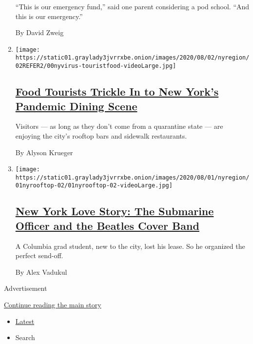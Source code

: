 \begin{enumerate}
  ``This is our emergency fund,'' said one parent considering a pod
  school. ``And this is our emergency.''

  By David Zweig
\item
  \texttt{[image: https://static01.graylady3jvrrxbe.onion/images/2020/08/02/nyregion/02REFER2/00nyvirus-touristfood-videoLarge.jpg]}

  \hypertarget{food-tourists-trickle-in-to-new-yorks-pandemic-dining-scene}{%
  \subsection{\texorpdfstring{\href{/2020/07/30/nyregion/coronavirus-nyc-tourism-restaurants.html}{Food
  Tourists Trickle In to New York's Pandemic Dining
  Scene}}{Food Tourists Trickle In to New York's Pandemic Dining Scene}}\label{food-tourists-trickle-in-to-new-yorks-pandemic-dining-scene}}

  Visitors --- as long as they don't come from a quarantine state ---
  are enjoying the city's rooftop bars and sidewalk restaurants.

  By Alyson Krueger
\item
  \texttt{[image: https://static01.graylady3jvrrxbe.onion/images/2020/08/01/nyregion/01nyrooftop-02/01nyrooftop-02-videoLarge.jpg]}

  \hypertarget{new-york-love-story-the-submarine-officer-and-the-beatles-cover-band}{%
  \subsection{\texorpdfstring{\href{/2020/07/30/nyregion/coronavirus-beatles-nyc.html}{New
  York Love Story: The Submarine Officer and the Beatles Cover
  Band}}{New York Love Story: The Submarine Officer and the Beatles Cover Band}}\label{new-york-love-story-the-submarine-officer-and-the-beatles-cover-band}}

  A Columbia grad student, new to the city, lost his lease. So he
  organized the perfect send-off.

  By Alex Vadukul
\end{enumerate}

Advertisement

\protect\hyperlink{after-mid1}{Continue reading the main story}

\begin{itemize}
\tightlist
\item
  \protect\hyperlink{stream-panel}{Latest}
\item
  Search
\end{itemize}

